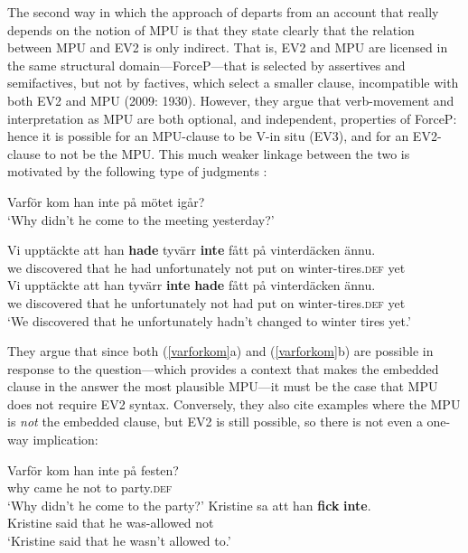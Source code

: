 \documentclass[output=paper]{LSP/langsci}
\begin{document}
The second way in which the approach of \cite{wiklund-etal09} departs from an account that really depends on the notion of MPU is that they state clearly that the relation between MPU and EV2 is only indirect. That is, EV2 and MPU are licensed in the same structural domain---ForceP---that is selected by assertives and semifactives, but not by factives, which select a smaller clause, incompatible with both EV2 and MPU (2009: 1930). However, they argue that verb-movement and interpretation as MPU are both optional, and independent, properties of ForceP: hence it is possible for an MPU-clause to be V-in situ (EV3), and for an EV2-clause to not be the MPU. This much weaker linkage between the two is motivated by the following type of judgments \citep[1927]{wiklund-etal09}:
\begin{exe}
\ex Varf\"or kom han inte p{\aa} m\"otet ig{\aa}r?\\
`Why didn't he come to the meeting yesterday?' \label{varforkom}
\begin{xlist}
\ex \gll Vi uppt\"ackte att han \textbf{hade} tyv\"arr \textbf{inte} f{\aa}tt p{\aa} vinterd\"acken \"annu.\\ 
			we discovered that he had unfortunately not put on winter-tires.\textsc{def} yet\\ 
\ex \gll Vi uppt\"ackte att han tyv\"arr \textbf{inte} \textbf{hade} f{\aa}tt p{\aa} vinterd\"acken \"annu.\\ 
			we discovered that he unfortunately not had put on winter-tires.\textsc{def} yet \\
			\trans `We discovered that he unfortunately hadn't changed to winter tires yet.' 
\end{xlist}
\end{exe}

They argue that since both (\ref{varforkom}a) and (\ref{varforkom}b) are possible in response to the question---which provides a context that makes the embedded clause in the answer the most plausible MPU---it must be the case that MPU does not require EV2 syntax. Conversely, they also cite examples where the MPU is \emph{not} the embedded clause, but EV2 is still possible, so there is not even a one-way implication:
\begin{exe}
\ex \label{varforkopte}
\begin{xlist}
\ex \gll  Varf\"or kom han inte p{\aa} festen? \\
               why came he not to party.\textsc{def} \\
               \trans `Why didn't he come to the party?'
\ex \gll Kristine sa att han \textbf{fick} \textbf{inte}. \\
         Kristine said that he was-allowed not\\
             \trans `Kristine said that he wasn't allowed to.'\hfill \cite[p.~1929]{wiklund-etal09}
\end{xlist}
\end{exe}
\end{document}
